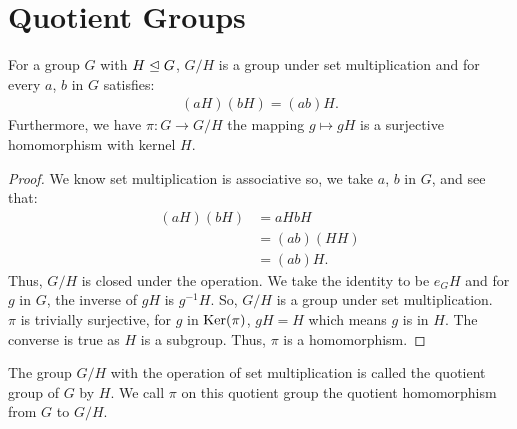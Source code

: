 \section{Quotient Groups}

For a group $G$ with $H \trianglelefteq G$, $G / H$ is a group under
set multiplication and for every $a$, $b$ in $G$ satisfies:
\begin{align*}
    (aH)(bH) = (ab)H.
\end{align*} Furthermore, we have $\pi : G \to G/H$ the
mapping $g \mapsto gH$ is a surjective homomorphism with
kernel $H$.

\begin{proof}
    We know set multiplication is associative so, we take 
    $a$, $b$ in $G$, and see that: \begin{align*}
        (aH)(bH) &= aHbH \\
        &= (ab)(HH) \tag{$H$ is normal} \\
        &= (ab)H. \tag{$H$ is a subgroup} 
    \end{align*} Thus, $G / H$ is closed under the operation.
    We take the identity to be $e_GH$ and for $g$ in $G$,
    the inverse of $gH$ is $g^{-1}H$. So, $G/H$ is a group
    under set multiplication.
    \\[\baselineskip]
    $\pi$ is trivially surjective, for $g$ in $\operatorname{Ker}(\pi)$,
    $gH = H$ which means $g$ is in $H$. The converse is
    true as $H$ is a subgroup. Thus, $\pi$ is a homomorphism.
\end{proof} 
\noindent
The group $G / H$ with the operation of set
multiplication is called the quotient group of $G$ by $H$.
We call $\pi$ on this quotient group the quotient homomorphism
from $G$ to $G / H$.